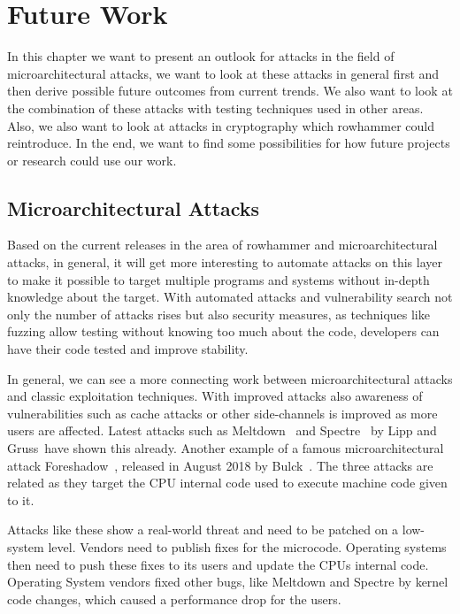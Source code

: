 \chapter{Future Work}\label{sec:futurework}

In this chapter we want to present an outlook for attacks in the field of
microarchitectural attacks, we want to look at these attacks in general first
and then derive possible future outcomes from current trends. We also want to
look at the combination of these attacks with testing techniques used in other
areas. Also, we also want to look at attacks in cryptography which rowhammer
could reintroduce. In the end, we want to find some possibilities for how future
projects or research could use our work.

\section{Microarchitectural Attacks}

Based on the current releases in the area of rowhammer and microarchitectural
attacks, in general, it will get more interesting to automate attacks on this
layer to make it possible to target multiple programs and systems without
in-depth knowledge about the target. With automated attacks and vulnerability
search not only the number of attacks rises but also security measures, as
techniques like fuzzing allow testing without knowing too much about the code,
developers can have their code tested and improve stability.

In general, we can see a more connecting work between microarchitectural attacks
and classic exploitation techniques. With improved attacks also awareness of
vulnerabilities such as cache attacks or other side-channels is improved as more
users are affected. Latest attacks such as Meltdown~\cite{meltdown} and
Spectre~\cite{spectre} by Lipp and Gruss~\etal have shown this already. Another
example of a famous microarchitectural attack Foreshadow~\cite{foreshadow},
released in August 2018 by Bulck~\etal. The three attacks are related as they
target the CPU internal code used to execute machine code given to it.

Attacks like these show a real-world threat and need to be patched on a
low-system level. Vendors need to publish fixes for the microcode. Operating
systems then need to push these fixes to its users and update the
CPU\textquotesingle s internal code. Operating System vendors fixed other bugs,
like Meltdown and Spectre by kernel code changes, which caused a performance
drop for the users.

